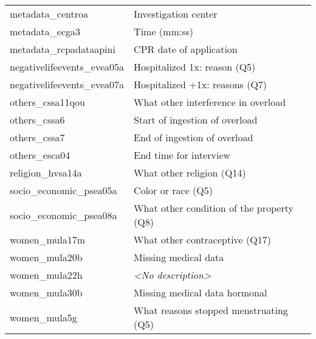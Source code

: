 \begin{table}[h]
\begin{center}
\begin{tabular}{l|l}
            metadata\_centroa                & Investigation center                      \\
            metadata\_ecga3                  & Time (mm:ss)                              \\
            metadata\_rcpadataapini          & CPR date of application                   \\
            negativelifeevents\_evea05a      & Hospitalized 1x: reason (Q5)              \\
            negativelifeevents\_evea07a      & Hospitalized +1x: reasons (Q7)            \\
            others\_cssa11qou                & What other interference in overload       \\
            others\_cssa6                    & Start of ingestion of overload            \\
            others\_cssa7                    & End of ingestion of overload              \\
            others\_esca04                   & End time for interview                    \\
            religion\_hvsa14a                & What other religion (Q14)                 \\
            socio\_economic\_psea05a         & Color or race (Q5)                        \\
            socio\_economic\_psea08a         & What other condition of the property (Q8) \\
            women\_mula17m                   & What other contraceptive (Q17)            \\
            women\_mula20b                   & Missing medical data                      \\
            women\_mula22h                   & \textit{<No description>}                 \\
            women\_mula30b                   & Missing medical data hormonal             \\
            women\_mula5g                    & What reasons stopped menstruating (Q5)    \\
            \hline
        \end{tabular}
    \end{center}
    \label{tab:free-text-removed}
\end{table}

